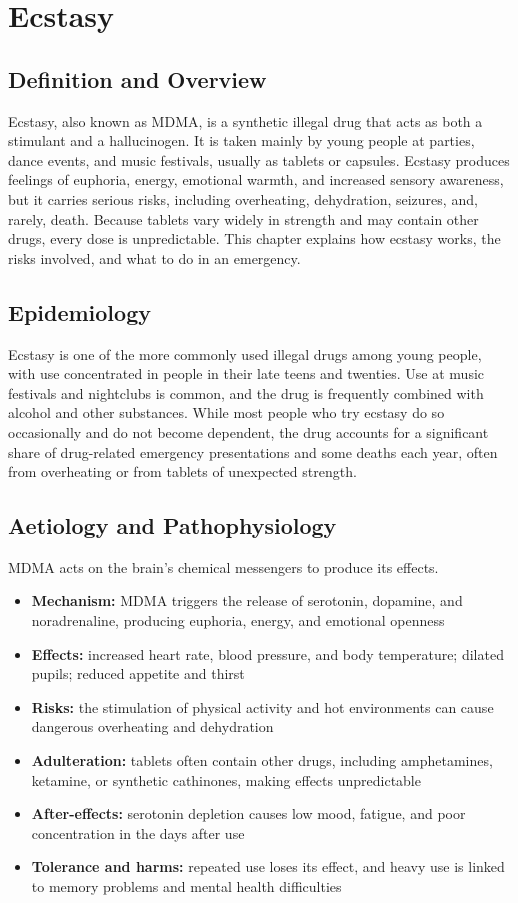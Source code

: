 \chapter{Ecstasy}

\section*{Definition and Overview}
Ecstasy, also known as MDMA, is a synthetic illegal drug that acts as both a stimulant and a hallucinogen. It is taken mainly by young people at parties, dance events, and music festivals, usually as tablets or capsules. Ecstasy produces feelings of euphoria, energy, emotional warmth, and increased sensory awareness, but it carries serious risks, including overheating, dehydration, seizures, and, rarely, death. Because tablets vary widely in strength and may contain other drugs, every dose is unpredictable. This chapter explains how ecstasy works, the risks involved, and what to do in an emergency.

\section*{Epidemiology}
Ecstasy is one of the more commonly used illegal drugs among young people, with use concentrated in people in their late teens and twenties. Use at music festivals and nightclubs is common, and the drug is frequently combined with alcohol and other substances. While most people who try ecstasy do so occasionally and do not become dependent, the drug accounts for a significant share of drug-related emergency presentations and some deaths each year, often from overheating or from tablets of unexpected strength.

\section*{Aetiology and Pathophysiology}
MDMA acts on the brain's chemical messengers to produce its effects.
\begin{itemize}
    \item \textbf{Mechanism:} MDMA triggers the release of serotonin, dopamine, and noradrenaline, producing euphoria, energy, and emotional openness
    \item \textbf{Effects:} increased heart rate, blood pressure, and body temperature; dilated pupils; reduced appetite and thirst
    \item \textbf{Risks:} the stimulation of physical activity and hot environments can cause dangerous overheating and dehydration
    \item \textbf{Adulteration:} tablets often contain other drugs, including amphetamines, ketamine, or synthetic cathinones, making effects unpredictable
    \item \textbf{After-effects:} serotonin depletion causes low mood, fatigue, and poor concentration in the days after use
    \item \textbf{Tolerance and harms:} repeated use loses its effect, and heavy use is linked to memory problems and mental health difficulties
\end{itemize}

